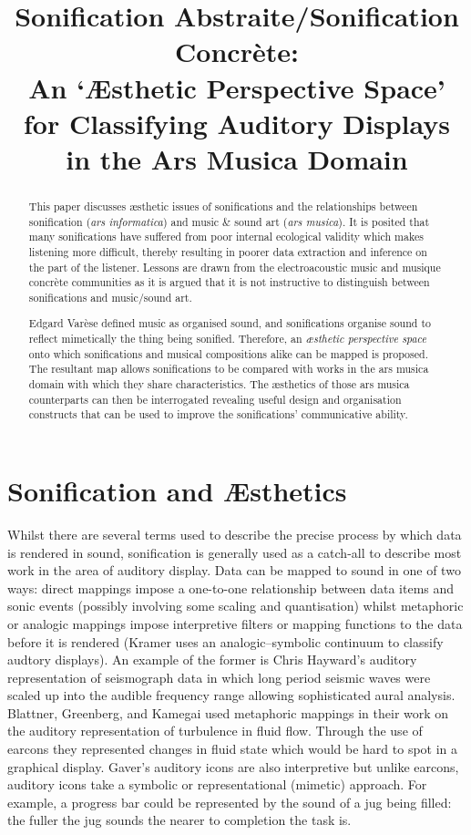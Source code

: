 \documentclass{article}
\title{Sonification Abstraite/Sonification Concrète:\\
An `Æsthetic Perspective Space' for Classifying Auditory Displays in the Ars Musica Domain}
\begin{document}
 
\maketitle 
\begin{abstract} 
This paper discusses æsthetic issues of sonifications and the relationships between sonification (\textit{ars informatica}) and music \& sound art (\textit{ars musica}). It is posited that many sonifications have suffered from poor internal ecological validity which makes listening more difficult, thereby resulting in poorer data extraction and inference on the part of the listener. Lessons are drawn from the electroacoustic music and musique concrète communities as it is argued that it is not instructive to distinguish between sonifications and music/sound art. 

Edgard Varèse defined music as organised sound, and sonifications organise sound to reflect mimetically the thing being sonified. Therefore, an \textit{æsthetic perspective space} onto which sonifications and musical compositions alike can be mapped is proposed. The resultant map allows sonifications to be compared with works in the ars musica domain with which they share characteristics. The æsthetics of those ars musica counterparts can then be interrogated revealing useful design and organisation constructs that can be used to improve the sonifications' communicative ability.
\end{abstract} 
\section{Sonification and Æsthetics}
Whilst there are several terms used to describe the precise process by which data is rendered in sound, sonification is generally used as a catch-all to describe most work in the area of auditory display. Data can be mapped to sound in one of two ways: direct mappings impose a one-to-one relationship between data items and sonic events (possibly involving some scaling and quantisation) whilst metaphoric or analogic mappings impose interpretive filters or mapping functions to the data before it is rendered (Kramer \cite{Kramer:1994b} uses an analogic--symbolic continuum to classify audtory displays). An example of the former is Chris Hayward's auditory representation of seismograph data in which long period seismic waves were scaled up into the audible frequency range \cite{Hayward:1994} allowing sophisticated aural analysis. Blattner, Greenberg, and Kamegai \cite{Blattner:1992} used metaphoric mappings in their work on the auditory representation of turbulence in fluid flow. Through the use of earcons they represented changes in fluid state which would be hard to spot in a graphical display. Gaver's auditory icons \cite{Gaver:1989} are also interpretive but unlike earcons, auditory icons take a symbolic or representational (mimetic) approach. For example, a progress bar could be represented by the sound of a jug being filled: the fuller the jug sounds the nearer to completion the task is. 
\end{document}
